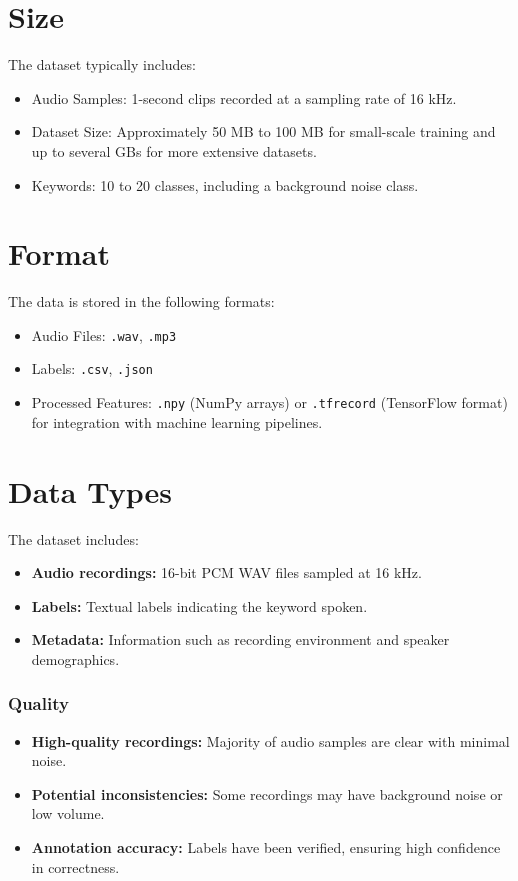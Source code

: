 \section{Size}

The dataset typically includes:

\begin{itemize}
	\item Audio Samples: 1-second clips recorded at a sampling rate of 16 kHz.
	\item Dataset Size: Approximately 50 MB to 100 MB for small-scale training and up to several GBs for more extensive datasets.
	\item Keywords: 10 to 20 classes, including a background noise class.
\end{itemize}


\section{Format}

The data is stored in the following formats:

\begin{itemize}
	\item Audio Files: \texttt{.wav}, \texttt{.mp3}
	\item Labels: \texttt{.csv}, \texttt{.json}
	\item Processed Features: \texttt{.npy} (NumPy arrays) or \texttt{.tfrecord} (TensorFlow format) for integration with machine learning pipelines.
\end{itemize}

\section{Data Types}

The dataset includes:
\begin{itemize}
	\item \textbf{Audio recordings:} 16-bit PCM WAV files sampled at 16 kHz.
	\item \textbf{Labels:} Textual labels indicating the keyword spoken.
	\item \textbf{Metadata:} Information such as recording environment and speaker demographics.
\end{itemize}


\subsubsection{Quality}
\begin{itemize}
	\item \textbf{High-quality recordings:} Majority of audio samples are clear with minimal noise.
	\item \textbf{Potential inconsistencies:} Some recordings may have background noise or low volume.
	\item \textbf{Annotation accuracy:} Labels have been verified, ensuring high confidence in correctness.
\end{itemize}

